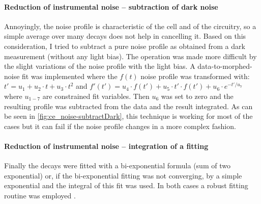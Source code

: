 	\paragraph{Reduction of instrumental noise -- subtraction of dark noise}
	Annoyingly, the noise profile is characteristic of the cell and of the circuitry, so a simple average over many decays does not help in cancelling it. Based on this consideration, I tried to subtract a pure noise profile as obtained from a dark measurement (without any light bias).
	The operation was made more difficult by the slight variations of the noise profile with the light bias.
	A data-to-morphed-noise fit was implemented where the $f(t)$ noise profile was transformed with: $t'= u_1 + u_2 \cdot t + u_3 \cdot t^2$ and $f'(t') = u_4 \cdot f(t') + u_5 \cdot t' \cdot f(t') + u_6 \cdot e^{-t'/u_7}$ where $u_{1-7}$ are constrained fit variables.
	Then $u_6$ was set to zero and the resulting profile was subtracted from the data and the result integrated.
	As can be seen in \cref{fig:ce_noise-subtractDark}, this technique is working for most of the cases but it can fail if the noise profile changes in a more complex fashion.
	
	
	\paragraph{Reduction of instrumental noise -- integration of a fitting} Finally the decays were fitted with a bi-exponential formula (sum of two exponential) or, if the bi-exponential fitting was not converging, by a simple exponential and the integral of this fit was used. In both cases a robust fitting routine was employed \cite{Maechler2018}.
	
